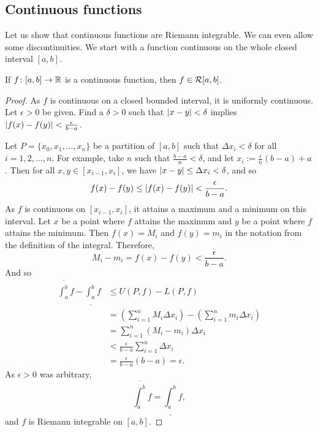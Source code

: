 \subsection{Continuous functions}

Let us show that continuous functions are Riemann integrable.
We can even allow some discontinuities.  We start with a
function continuous on the whole closed interval $[a,b]$.

\begin{lemma} \label{lemma:contint}
If $f \colon [a,b] \to {\mathbb{R}}$ is a continuous function,
then $f \in {\mathcal{R}}[a,b]$.
\end{lemma}

\begin{proof}
As $f$ is continuous on a closed bounded interval, it is
uniformly continuous.
Let $\epsilon > 0$ be given.  Find a $\delta > 0$ such that
$\left\lvert {x-y} \right\rvert < \delta$ implies $\left\lvert {f(x)-f(y)} \right\rvert < \frac{\epsilon}{b-a}$.

Let $P = \{ x_0, x_1, \ldots, x_n \}$
be a partition of $[a,b]$ such that $\Delta x_i < \delta$ for all $i = 1,2,
\ldots, n$.  For example,
take $n$ such that $\frac{b-a}{n} < \delta$, and
let $x_i := \frac{i}{n}(b-a) + a$.
Then for all $x, y \in [x_{i-1},x_i]$, we have 
$\left\lvert {x-y} \right\rvert \leq \Delta x_i < \delta$, and so
\begin{equation*}
f(x)-f(y) \leq \left\lvert {f(x)-f(y)} \right\rvert < \frac{\epsilon}{b-a} .
\end{equation*}
As $f$ is continuous on $[x_{i-1},x_i]$, it attains a maximum and a minimum
on this interval.
Let $x$ be a point where $f$ attains the maximum and $y$ be a point
where $f$ attains the minimum.  Then $f(x) = M_i$
and $f(y) = m_i$ in the notation from the definition of the integral.
Therefore,
\begin{equation*}
M_i-m_i = f(x)-f(y) < 
\frac{\epsilon}{b-a} .
\end{equation*}
And so
\begin{equation*}
\begin{split}
\overline{\int_a^b} f - 
\underline{\int_a^b} f 
& \leq
U(P,f) - L(P,f)
\\
& =
\left(
\sum_{i=1}^n
M_i \Delta x_i
\right)
-
\left(
\sum_{i=1}^n
m_i \Delta x_i
\right)
\\
& =
\sum_{i=1}^n
(M_i-m_i) \Delta x_i
\\
& <
\frac{\epsilon}{b-a}
\sum_{i=1}^n
\Delta x_i
\\
& =
\frac{\epsilon}{b-a} (b-a)
= \epsilon .
\end{split}
\end{equation*}
As $\epsilon > 0$ was arbitrary,
\begin{equation*}
\overline{\int_a^b} f = \underline{\int_a^b} f ,
\end{equation*}
and $f$ is Riemann integrable on $[a,b]$.
\end{proof}

